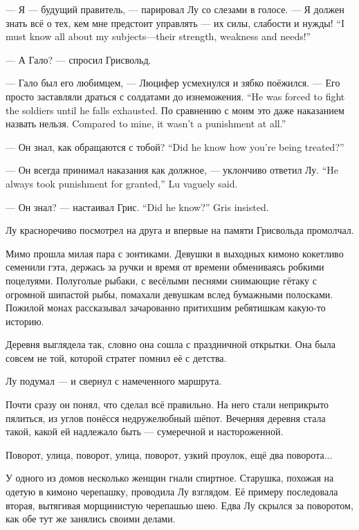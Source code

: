--- Я --- будущий правитель, --- парировал Лу со слезами в голосе.
{--- Я должен знать всё о тех, кем мне предстоит управлять --- их силы, слабости и нужды!}
{``I must know all about my subjects---their strength, weakness and needs!''}

--- А Гало? --- спросил Грисвольд.

--- Гало был его любимцем, --- Люцифер усмехнулся и зябко поёжился.
{--- Его просто заставляли драться с солдатами до изнеможения.}
{``He was forced to fight the soldiers until he falls exhausted.}
{По сравнению с моим это даже наказанием назвать нельзя.}
{Compared to mine, it wasn't a punishment at all.''}

{--- Он знал, как обращаются с тобой?}
{``Did he know how you're being treated?''}

{--- Он всегда принимал наказания как должное, --- уклончиво ответил Лу.}
{``He always took punishment for granted,'' Lu vaguely said.}

{--- Он знал? --- настаивал Грис.}
{``Did he know?'' Gris insisted.}

Лу красноречиво посмотрел на друга и впервые на памяти Грисвольда промолчал.

Мимо прошла милая пара с зонтиками.
Девушки в выходных кимоно кокетливо семенили гэта, держась за ручки и время от времени обмениваясь робкими поцелуями.
Полуголые рыбаки, с весёлыми песнями снимающие гётаку\FM{} с огромной шипастой рыбы, помахали девушкам вслед бумажными полосками.
Пожилой монах рассказывал зачарованно притихшим ребятишкам какую-то историю.

Деревня выглядела так, словно она сошла с праздничной открытки.
Она была совсем не той, которой стратег помнил её с детства.

Лу подумал --- и свернул с намеченного маршрута.

Почти сразу он понял, что сделал всё правильно.
На него стали неприкрыто пялиться, из углов понёсся недружелюбный шёпот.
Вечерняя деревня стала такой, какой ей надлежало быть --- сумеречной и настороженной.

Поворот, улица, поворот, улица, поворот, узкий проулок, ещё два поворота...

У одного из домов несколько женщин гнали спиртное.
Старушка, похожая на одетую в кимоно черепашку, проводила Лу взглядом.
Её примеру последовала вторая, вытягивая морщинистую черепашью шею.
Едва Лу скрылся за поворотом, как обе тут же занялись своими делами.


